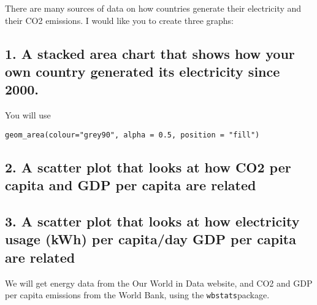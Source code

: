\documentclass[
]{article}
\begin{document}
There are many sources of data on how countries generate their
electricity and their CO2 emissions. I would like you to create three
graphs:

\hypertarget{a-stacked-area-chart-that-shows-how-your-own-country-generated-its-electricity-since-2000.}{%
\subsection{1. A stacked area chart that shows how your own country
generated its electricity since
2000.}\label{a-stacked-area-chart-that-shows-how-your-own-country-generated-its-electricity-since-2000.}}

You will use

\texttt{geom\_area(colour="grey90",\ alpha\ =\ 0.5,\ position\ =\ "fill")}

\hypertarget{a-scatter-plot-that-looks-at-how-co2-per-capita-and-gdp-per-capita-are-related}{%
\subsection{2. A scatter plot that looks at how CO2 per capita and GDP
per capita are
related}\label{a-scatter-plot-that-looks-at-how-co2-per-capita-and-gdp-per-capita-are-related}}

\hypertarget{a-scatter-plot-that-looks-at-how-electricity-usage-kwh-per-capitaday-gdp-per-capita-are-related}{%
\subsection{3. A scatter plot that looks at how electricity usage (kWh)
per capita/day GDP per capita are
related}\label{a-scatter-plot-that-looks-at-how-electricity-usage-kwh-per-capitaday-gdp-per-capita-are-related}}

We will get energy data from the Our World in Data website, and CO2 and
GDP per capita emissions from the World Bank, using the
\texttt{wbstats}package.
\end{document}
